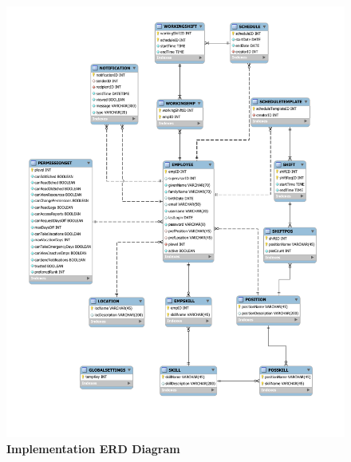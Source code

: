\documentclass[letterpaper,12pt]{report}
\begin{document}
{\begin{figure}[ImplementationERD]
 \includegraphics[scale=0.8,trim=25mm 00mm 25mm 20mm]{externals/InternalERD.pdf}
 \caption{\small
\textbf{Implementation ERD Diagram}}\label{fig:implemERD}
\end{figure}
}
\end{document}
